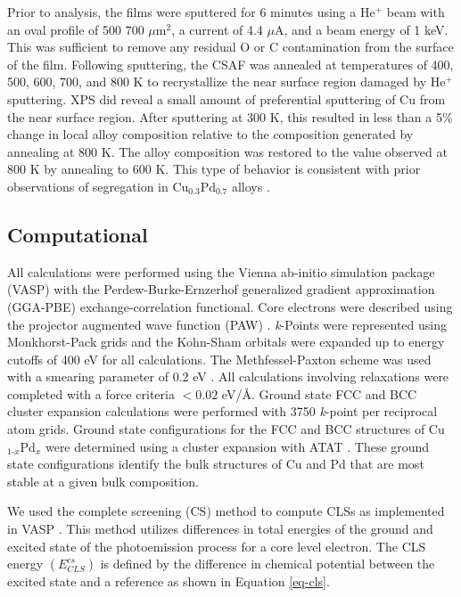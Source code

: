 \documentclass[number, sort&compress, review, 12pt]{elsarticle}
\begin{document}
Prior to analysis, the films were sputtered for 6 minutes using a He$^+$ beam with an oval profile of 500 \texttimes{} 700 $\mu$m$^{\text{2}}$, a current of 4.4 $\mu$A, and a beam energy of 1 keV. This was sufficient to remove any residual O or C contamination from the surface of the film. Following sputtering, the CSAF was annealed at temperatures of 400, 500, 600, 700, and 800 K to recrystallize the near surface region damaged by He$^{\text{+}}$ sputtering.  XPS did reveal a small amount of preferential sputtering of Cu from the near surface region.  After sputtering at 300 K, this resulted in less than a 5\% change in local alloy composition relative to the composition generated by annealing at 800 K.  The alloy composition was restored to the value observed at 800 K by annealing to 600 K.  This type of behavior is consistent with prior observations of segregation in Cu$_{\text{0.3}}$Pd$_{\text{0.7}}$ alloys \cite{miller-2008-surfac-segreg}.

\subsection{Computational}
\label{sec-2-2}
All calculations were performed using the Vienna ab-initio simulation package (VASP) \cite{kresse-1993-ab,kresse-1994-ab,kresse-1996-effic,kresse-1996-effic2} with the Perdew-Burke-Ernzerhof generalized gradient approximation (GGA-PBE) \cite{perdew-1996-gener-gradien,perdew-1997-gener-gradien} exchange-correlation functional. Core electrons were described using the projector augmented wave function (PAW) \cite{blochl-1994-projec-augmen,kresse-1999-from-ultras}. \emph{k}-Points were represented using Monkhorst-Pack grids \cite{monkhorst-1976-special-point} and the Kohn-Sham orbitals were expanded up to energy cutoffs of 400 eV for all calculations. The Methfessel-Paxton scheme was used with a smearing parameter of 0.2 eV \cite{methfessel-1989-high-precis}. All calculations involving relaxations were completed with a force criteria $< 0.02$ eV/\AA{}. Ground state FCC and BCC cluster expansion calculations were performed with 3750 \emph{k}-point per reciprocal atom grids. Ground state configurations for the FCC and BCC structures of Cu$_{\text{1-}x}$Pd$_x$ were determined using a cluster expansion with ATAT \cite{walle-2002-self-monte,walle-2002-autom}. These ground state configurations identify the bulk structures of Cu and Pd that are most stable at a given bulk composition.

We used the complete screening (CS) method to compute CLSs as implemented in VASP \cite{kohler-2004-densit-funct}. This method utilizes differences in total energies of the ground and excited state of the photoemission process for a core level electron. The CLS energy \((E^{cs}_{CLS})\) is defined by the difference in chemical potential between the excited state and a reference as shown in Equation \ref{eq-cls}.
\end{document}
